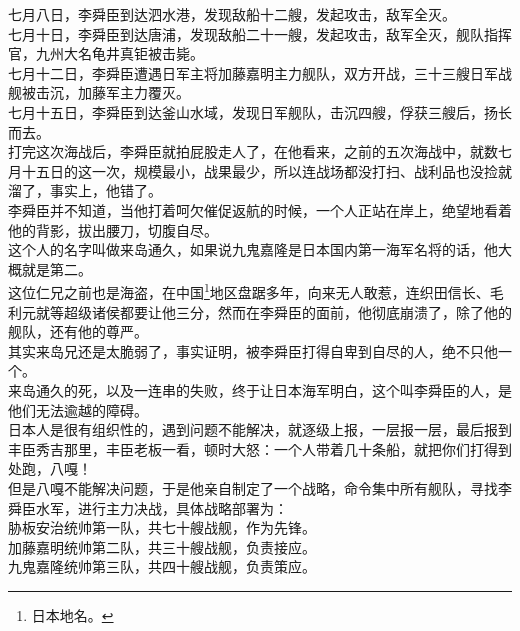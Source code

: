 \begin{multicols}{\theparacolNo}
七月八日，李舜臣到达泗水港，发现敌船十二艘，发起攻击，敌军全灭。\\

七月十日，李舜臣到达唐浦，发现敌船二十一艘，发起攻击，敌军全灭，舰队指挥官，九州大名龟井真钜被击毙。\\

七月十二日，李舜臣遭遇日军主将加藤嘉明主力舰队，双方开战，三十三艘日军战舰被击沉，加藤军主力覆灭。\\

七月十五日，李舜臣到达釜山水域，发现日军舰队，击沉四艘，俘获三艘后，扬长而去。\\

打完这次海战后，李舜臣就拍屁股走人了，在他看来，之前的五次海战中，就数七月十五日的这一次，规模最小，战果最少，所以连战场都没打扫、战利品也没捡就溜了，事实上，他错了。\\

李舜臣并不知道，当他打着呵欠催促返航的时候，一个人正站在岸上，绝望地看着他的背影，拔出腰刀，切腹自尽。\\

这个人的名字叫做来岛通久，如果说九鬼嘉隆是日本国内第一海军名将的话，他大概就是第二。\\

这位仁兄之前也是海盗，在中国\footnote{日本地名。}地区盘踞多年，向来无人敢惹，连织田信长、毛利元就等超级诸侯都要让他三分，然而在李舜臣的面前，他彻底崩溃了，除了他的舰队，还有他的尊严。\\

其实来岛兄还是太脆弱了，事实证明，被李舜臣打得自卑到自尽的人，绝不只他一个。\\

来岛通久的死，以及一连串的失败，终于让日本海军明白，这个叫李舜臣的人，是他们无法逾越的障碍。\\

日本人是很有组织性的，遇到问题不能解决，就逐级上报，一层报一层，最后报到丰臣秀吉那里，丰臣老板一看，顿时大怒：一个人带着几十条船，就把你们打得到处跑，八嘎！\\

但是八嘎不能解决问题，于是他亲自制定了一个战略，命令集中所有舰队，寻找李舜臣水军，进行主力决战，具体战略部署为：\\

胁板安治统帅第一队，共七十艘战舰，作为先锋。\\

加藤嘉明统帅第二队，共三十艘战舰，负责接应。\\

九鬼嘉隆统帅第三队，共四十艘战舰，负责策应。\\


\end{multicols}
